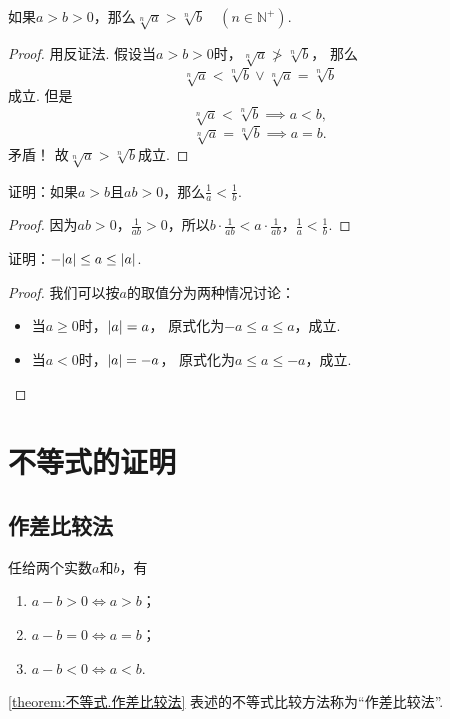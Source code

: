 \begin{theorem}
如果\(a>b>0\)，那么\(\sqrt[n]a > \sqrt[n]b \quad (n\in\mathbb{N}^+)\).
\begin{proof}
用反证法.
假设当\(a>b>0\)时，\(\sqrt[n]{a} \ngtr \sqrt[n]{b}\)，
那么\[
	\sqrt[n]{a} < \sqrt[n]{b}
	\lor
	\sqrt[n]{a} = \sqrt[n]{b}
\]成立.
但是\[
\sqrt[n]{a} < \sqrt[n]{b} \implies a<b,
\]\[
\sqrt[n]{a} = \sqrt[n]{b} \implies a=b.
\]矛盾！
故\(\sqrt[n]{a}>\sqrt[n]{b}\)成立.
\end{proof}
\end{theorem}

\begin{example}
证明：如果\(a > b\)且\(ab > 0\)，那么\(\frac{1}{a} < \frac{1}{b}\).
\begin{proof}
因为\(ab > 0\)，\(\frac{1}{ab} > 0\)，所以\(b \cdot \frac{1}{ab} < a \cdot \frac{1}{ab}\)，\(\frac{1}{a} < \frac{1}{b}\).
\end{proof}
\end{example}

\begin{example}
证明：\(-\abs{a} \leq a \leq \abs{a}\).
\begin{proof}
我们可以按\(a\)的取值分为两种情况讨论：
\begin{itemize}
	\item 当\(a \geq 0\)时，\(\abs{a}=a\)，
	原式化为\(-a \leq a \leq a\)，成立.
	\item 当\(a < 0\)时，\(\abs{a}=-a\)，
	原式化为\(a \leq a \leq -a\)，成立.
	\qedhere
\end{itemize}
\end{proof}
\end{example}

\section{不等式的证明}
\subsection{作差比较法}
\begin{theorem}\label{theorem:不等式.作差比较法}
任给两个实数\(a\)和\(b\)，有\begin{enumerate}
\item \(a - b > 0 \iff a > b\)；
\item \(a - b = 0 \iff a = b\)；
\item \(a - b < 0 \iff a < b\).
\end{enumerate}
\end{theorem}
\cref{theorem:不等式.作差比较法} 表述的不等式比较方法称为“作差比较法”.

